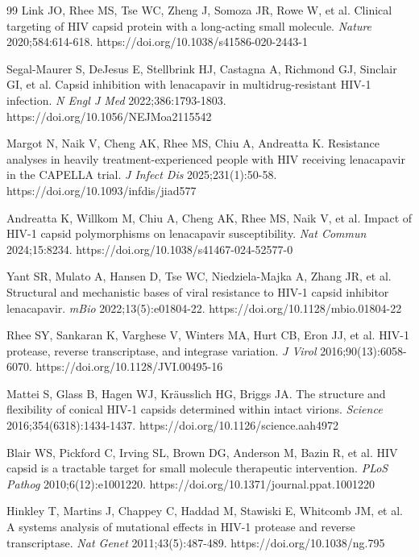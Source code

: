 \documentclass[preprint]{elsarticle}
\begin{document}
\begin{thebibliography}{99}
 Link JO, Rhee MS, Tse WC, Zheng J, Somoza JR, Rowe W, et al. Clinical targeting of HIV capsid protein with a long-acting small molecule. \textit{Nature} 2020;584:614-618. https://doi.org/10.1038/s41586-020-2443-1

 Segal-Maurer S, DeJesus E, Stellbrink HJ, Castagna A, Richmond GJ, Sinclair GI, et al. Capsid inhibition with lenacapavir in multidrug-resistant HIV-1 infection. \textit{N Engl J Med} 2022;386:1793-1803. https://doi.org/10.1056/NEJMoa2115542

 Margot N, Naik V, Cheng AK, Rhee MS, Chiu A, Andreatta K. Resistance analyses in heavily treatment-experienced people with HIV receiving lenacapavir in the CAPELLA trial. \textit{J Infect Dis} 2025;231(1):50-58. https://doi.org/10.1093/infdis/jiad577

 Andreatta K, Willkom M, Chiu A, Cheng AK, Rhee MS, Naik V, et al. Impact of HIV-1 capsid polymorphisms on lenacapavir susceptibility. \textit{Nat Commun} 2024;15:8234. https://doi.org/10.1038/s41467-024-52577-0

 Yant SR, Mulato A, Hansen D, Tse WC, Niedziela-Majka A, Zhang JR, et al. Structural and mechanistic bases of viral resistance to HIV-1 capsid inhibitor lenacapavir. \textit{mBio} 2022;13(5):e01804-22. https://doi.org/10.1128/mbio.01804-22

 Rhee SY, Sankaran K, Varghese V, Winters MA, Hurt CB, Eron JJ, et al. HIV-1 protease, reverse transcriptase, and integrase variation. \textit{J Virol} 2016;90(13):6058-6070. https://doi.org/10.1128/JVI.00495-16

 Mattei S, Glass B, Hagen WJ, Kräusslich HG, Briggs JA. The structure and flexibility of conical HIV-1 capsids determined within intact virions. \textit{Science} 2016;354(6318):1434-1437. https://doi.org/10.1126/science.aah4972

 Blair WS, Pickford C, Irving SL, Brown DG, Anderson M, Bazin R, et al. HIV capsid is a tractable target for small molecule therapeutic intervention. \textit{PLoS Pathog} 2010;6(12):e1001220. https://doi.org/10.1371/journal.ppat.1001220

 Hinkley T, Martins J, Chappey C, Haddad M, Stawiski E, Whitcomb JM, et al. A systems analysis of mutational effects in HIV-1 protease and reverse transcriptase. \textit{Nat Genet} 2011;43(5):487-489. https://doi.org/10.1038/ng.795


\end{thebibliography}
\end{document}

